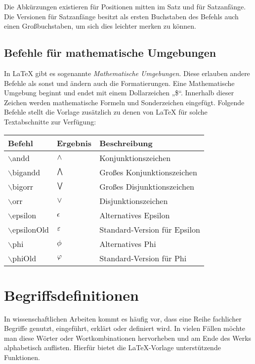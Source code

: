 				Die Abkürzungen existieren für Positionen mitten im Satz und für Satzanfänge. Die Versionen für Satzanfänge besitzt als ersten Buchstaben des Befehls auch einen Großbuchstaben, um sich dies leichter merken zu können.  
				
			\subsection{Befehle für mathematische Umgebungen}
			
				In \LaTeX{} gibt es sogenannte \emph{Mathematische Umgebungen}. Diese erlauben andere Befehle als sonst und ändern auch die Formatierungen. Eine Mathematische Umgebung beginnt und endet mit einem Dollarzeichen „\$“. Innerhalb dieser Zeichen werden mathematische Formeln und Sonderzeichen eingefügt. Folgende Befehle stellt die Vorlage zusätzlich zu denen von \LaTeX{} für solche Textabschnitte zur Verfügung: \newline
				
				\begin{tabular}{|p{5 cm}|p{4 cm}|p{5 cm}|}
					\hline \textbf{Befehl} & \textbf{Ergebnis} & \textbf{Beschreibung} \\ 
					\hline $\backslash$andd & $\wedge$ & Konjunktionszeichen \\
					\hline $\backslash$bigandd & $\bigwedge$ & Großes Konjunktionszeichen \\
					\hline $\backslash$bigorr & $\bigvee$ & Großes Disjunktionszeichen \\
					\hline $\backslash$orr & $\vee$ & Disjunktionszeichen \\
					\hline $\backslash$epsilon & $\epsilon$ & Alternatives Epsilon \\
					\hline $\backslash$epsilonOld & $\epsilonOld$ & Standard-Version für Epsilon \\
					\hline $\backslash$phi & $\phi$ & Alternatives Phi \\
					\hline $\backslash$phiOld & $\phiOld$ & Standard-Version für Phi \\
					\hline
				\end{tabular}
				
		\section{Begriffsdefinitionen}
		
			In wissenschaftlichen Arbeiten kommt es häufig vor, dass eine Reihe fachlicher Begriffe genutzt, eingeführt, erklärt oder definiert wird. In vielen Fällen möchte man diese Wörter oder Wortkombinationen hervorheben und am Ende des Werks alphabetisch auflisten. Hierfür bietet die \LaTeX{}-Vorlage unterstützende Funktionen. 
			
